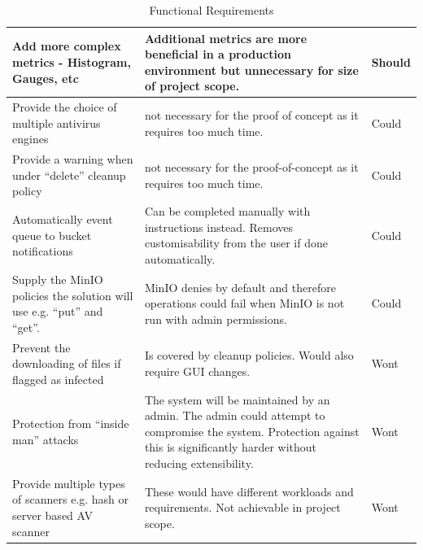 \documentclass[12pt, conference, final, a4paper, onecolumn, compsoc]{IEEEtran}
\begin{document}
\begin{table}[H]
\begin{tabular}{|p{}|p{}|l|}
Add more complex metrics - Histogram, Gauges, etc & Additional metrics are more
                                                    beneficial in a production
                                                    environment but unnecessary
                                                    for size of project scope. & Should \\ \hline
    \hline
    Provide the choice of multiple antivirus engines & not necessary for the
proof of concept as it requires too much time. & Could \\ \hline
    Provide a warning when under ``delete'' cleanup policy & not necessary for the
proof-of-concept as it requires too much time. & Could \\ \hline
    Automatically event queue to bucket notifications & Can be completed
                                                        manually with
                                                        instructions instead.
                                                        Removes customisability
                                                        from the user if done automatically. & Could \\ \hline
     Supply the MinIO policies the solution will use e.g. ``put'' and ``get''. &
                                                                                 MinIO
                                                                                 denies
                                                by default and therefore
                                                                                 operations
                                                                                 could
                                                fail when MinIO is not run with
                                                                                 admin
                                                                                 permissions.
                                                & Could \\ \hline
    \hline

    Prevent the downloading of files if flagged as infected & Is covered by
cleanup policies. Would also require GUI changes. & Wont \\ \hline Protection
from ``inside man'' attacks & The system will be maintained by an admin. The
admin could attempt to compromise the system. Protection against this is
significantly harder without reducing extensibility. & Wont \\ \hline Provide
multiple types of scanners e.g. hash or server based AV scanner & These would
have different workloads and requirements. Not achievable in project scope. &
                                                                              Wont \\ \hline
  \end{tabular}
  \caption{Functional Requirements}
  \label{tab:functional-reqs}
\end{table}
\end{document}
